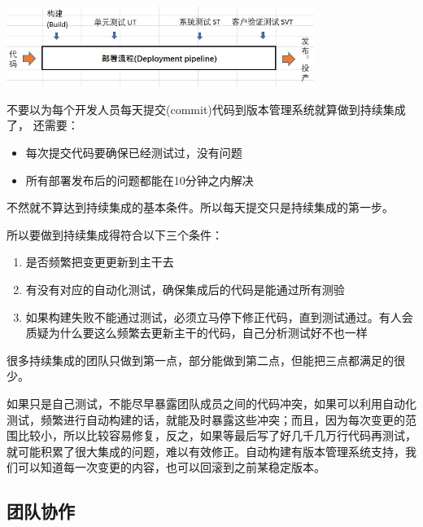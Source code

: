 
\includegraphics[width=10cm]{!DeployPipelineScreenshot_2022-05-20_210104.jpg}

不要以为每个开发人员每天提交(commit)代码到版本管理系统就算做到持续集成了，
还需要：

\begin{itemize}
\tightlist
\item
  每次提交代码要确保已经测试过，没有问题
\item
  所有部署发布后的问题都能在10分钟之内解决
\end{itemize}

不然就不算达到持续集成的基本条件。所以每天提交只是持续集成的第一步。

所以要做到持续集成得符合以下三个条件：

\begin{enumerate}
\tightlist
\item
  是否频繁把变更更新到主干去
\item
  有没有对应的自动化测试，确保集成后的代码是能通过所有测验
\item
  如果构建失败不能通过测试，必须立马停下修正代码，直到测试通过。有人会质疑为什么要这么频繁去更新主干的代码，自己分析测试好不也一样\\
\end{enumerate}

很多持续集成的团队只做到第一点，部分能做到第二点，但能把三点都满足的很少。

如果只是自己测试，不能尽早暴露团队成员之间的代码冲突，如果可以利用自动化测试，频繁进行自动构建的话，就能及时暴露这些冲突；而且，因为每次变更的范围比较小，所以比较容易修复，反之，如果等最后写了好几千几万行代码再测试，就可能积累了很大集成的问题，难以有效修正。自动构建有版本管理系统支持，我们可以知道每一次变更的内容，也可以回滚到之前某稳定版本。

\hypertarget{ux56e2ux961fux534fux4f5c}{%
\subsection{团队协作}\label{ux56e2ux961fux534fux4f5c}}

